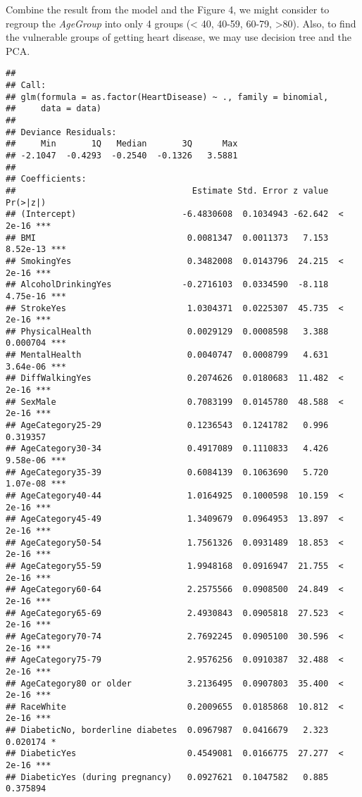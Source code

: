 \documentclass[
  11pt,
]{article}
\begin{document}
Combine the result from the model and the Figure 4, we might consider to
regroup the \emph{AgeGroup} into only 4 groups (\textless{} 40, 40-59,
60-79, \textgreater80). Also, to find the vulnerable groups of getting
heart disease, we may use decision tree and the PCA.

\begin{verbatim}
## 
## Call:
## glm(formula = as.factor(HeartDisease) ~ ., family = binomial, 
##     data = data)
## 
## Deviance Residuals: 
##     Min       1Q   Median       3Q      Max  
## -2.1047  -0.4293  -0.2540  -0.1326   3.5881  
## 
## Coefficients:
##                                   Estimate Std. Error z value Pr(>|z|)    
## (Intercept)                     -6.4830608  0.1034943 -62.642  < 2e-16 ***
## BMI                              0.0081347  0.0011373   7.153 8.52e-13 ***
## SmokingYes                       0.3482008  0.0143796  24.215  < 2e-16 ***
## AlcoholDrinkingYes              -0.2716103  0.0334590  -8.118 4.75e-16 ***
## StrokeYes                        1.0304371  0.0225307  45.735  < 2e-16 ***
## PhysicalHealth                   0.0029129  0.0008598   3.388 0.000704 ***
## MentalHealth                     0.0040747  0.0008799   4.631 3.64e-06 ***
## DiffWalkingYes                   0.2074626  0.0180683  11.482  < 2e-16 ***
## SexMale                          0.7083199  0.0145780  48.588  < 2e-16 ***
## AgeCategory25-29                 0.1236543  0.1241782   0.996 0.319357    
## AgeCategory30-34                 0.4917089  0.1110833   4.426 9.58e-06 ***
## AgeCategory35-39                 0.6084139  0.1063690   5.720 1.07e-08 ***
## AgeCategory40-44                 1.0164925  0.1000598  10.159  < 2e-16 ***
## AgeCategory45-49                 1.3409679  0.0964953  13.897  < 2e-16 ***
## AgeCategory50-54                 1.7561326  0.0931489  18.853  < 2e-16 ***
## AgeCategory55-59                 1.9948168  0.0916947  21.755  < 2e-16 ***
## AgeCategory60-64                 2.2575566  0.0908500  24.849  < 2e-16 ***
## AgeCategory65-69                 2.4930843  0.0905818  27.523  < 2e-16 ***
## AgeCategory70-74                 2.7692245  0.0905100  30.596  < 2e-16 ***
## AgeCategory75-79                 2.9576256  0.0910387  32.488  < 2e-16 ***
## AgeCategory80 or older           3.2136495  0.0907803  35.400  < 2e-16 ***
## RaceWhite                        0.2009655  0.0185868  10.812  < 2e-16 ***
## DiabeticNo, borderline diabetes  0.0967987  0.0416679   2.323 0.020174 *  
## DiabeticYes                      0.4549081  0.0166775  27.277  < 2e-16 ***
## DiabeticYes (during pregnancy)   0.0927621  0.1047582   0.885 0.375894    

\end{verbatim}
\end{document}
